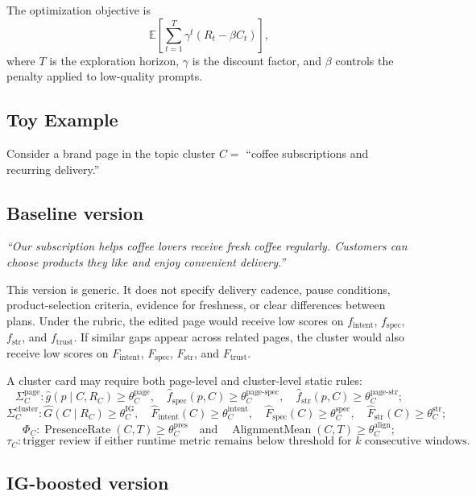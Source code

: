 \documentclass{article}
\begin{document}
The optimization objective is
\[
\mathbb{E}\left[\sum_{t=1}^{T}\gamma^t(R_t-\beta C_t)\right],
\]
where \(T\) is the exploration horizon, \(\gamma\) is the discount factor, and \(\beta\) controls the penalty applied to low-quality prompts.

\subsection{Toy Example}

Consider a brand page in the topic cluster \(C=\) ``coffee subscriptions and recurring delivery.''

\subsection*{Baseline version}

\emph{``Our subscription helps coffee lovers receive fresh coffee regularly. Customers can choose products they like and enjoy convenient delivery.''}

This version is generic. It does not specify delivery cadence, pause conditions, product-selection criteria, evidence for freshness, or clear differences between plans. Under the rubric, the edited page would receive low scores on \(f_{\text{intent}}\), \(f_{\text{spec}}\), \(f_{\text{str}}\), and \(f_{\text{trust}}\). If similar gaps appear across related pages, the cluster would also receive low scores on \(F_{\text{intent}}\), \(F_{\text{spec}}\), \(F_{\text{str}}\), and \(F_{\text{trust}}\).

A cluster card may require both page-level and cluster-level static rules:
\[
\Sigma_C^{\text{page}}:
\hat{g}(p \mid C,R_C)\ge\theta_C^{\text{page}},
\quad
\hat{f}_{\text{spec}}(p,C)\ge\theta_C^{\text{page-spec}},
\quad
\hat{f}_{\text{str}}(p,C)\ge\theta_C^{\text{page-str}};
\]
\[
\Sigma_C^{\text{cluster}}:
\hat{G}(C \mid R_C)\ge\theta_C^{\text{IG}},
\quad
\hat{F}_{\text{intent}}(C)\ge\theta_C^{\text{intent}},
\quad
\hat{F}_{\text{spec}}(C)\ge\theta_C^{\text{spec}},
\quad
\hat{F}_{\text{str}}(C)\ge\theta_C^{\text{str}};
\]
\[
\Phi_C:
\operatorname{PresenceRate}(C,T) \ge \theta_C^{\text{pres}}
\quad\text{and}\quad
\operatorname{AlignmentMean}(C,T) \ge \theta_C^{\text{align}};
\]
\[
\tau_C:
\text{trigger review if either runtime metric remains below threshold for }k\text{ consecutive windows.}
\]

\subsection*{IG-boosted version}
\end{document}
